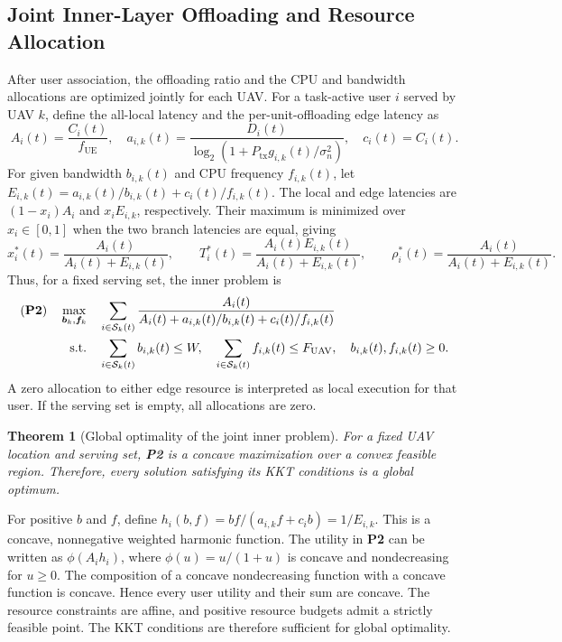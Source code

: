 \documentclass[journal]{IEEEtran}
\newtheorem{theorem}{\bf Theorem}
\begin{document}
\subsection{Joint Inner-Layer Offloading and Resource Allocation}\label{subsec:closed_form}
After user association, the offloading ratio and the CPU and bandwidth
allocations are optimized jointly for each UAV. For a task-active user $i$
served by UAV $k$, define the all-local latency and the per-unit-offloading
edge latency as
\begin{equation}
 A_i(t)=\frac{C_i(t)}{f_{\mathrm{UE}}},\quad
 a_{i,k}(t)=\frac{D_i(t)}
 {\log_2(1+P_{\mathrm{tx}}g_{i,k}(t)/\sigma_n^2)},\quad
 c_i(t)=C_i(t).
\end{equation}
For given bandwidth $b_{i,k}(t)$ and CPU frequency $f_{i,k}(t)$, let
$E_{i,k}(t)=a_{i,k}(t)/b_{i,k}(t)+c_i(t)/f_{i,k}(t)$. The local and edge
latencies are $(1-x_i)A_i$ and $x_iE_{i,k}$, respectively. Their maximum is
minimized over $x_i\in[0,1]$ when the two branch latencies are equal, giving
\begin{equation}\label{eq:optimal_offload_ratio}
 x_i^*(t)=\frac{A_i(t)}{A_i(t)+E_{i,k}(t)},\qquad
 T_i^*(t)=\frac{A_i(t)E_{i,k}(t)}{A_i(t)+E_{i,k}(t)},\qquad
 \rho_i^*(t)=\frac{A_i(t)}{A_i(t)+E_{i,k}(t)}.
\end{equation}
Thus, for a fixed serving set, the inner problem is
\begin{align}
(\textbf{P2})\quad
\max_{\bm{b}_k,\bm{f}_k}\quad&
 \sum_{i\in\mathcal{S}_k(t)}
 \frac{A_i(t)}
 {A_i(t)+a_{i,k}(t)/b_{i,k}(t)+c_i(t)/f_{i,k}(t)}
 \notag\\
\mathrm{s.t.}\quad&
 \sum_{i\in\mathcal{S}_k(t)} b_{i,k}(t)\le W,\quad
 \sum_{i\in\mathcal{S}_k(t)} f_{i,k}(t)\le F_{\mathrm{UAV}},\quad
 b_{i,k}(t),f_{i,k}(t)\ge 0.
\label{eq:joint_inner}
\end{align}
A zero allocation to either edge resource is interpreted as local execution
for that user. If the serving set is empty, all allocations are zero.

\begin{theorem}[Global optimality of the joint inner problem]
For a fixed UAV location and serving set, \textbf{P2} is a concave
maximization over a convex feasible region. Therefore, every solution
satisfying its KKT conditions is a global optimum.
\end{theorem}
\begin{IEEEproof}
For positive $b$ and $f$, define
$h_i(b,f)=bf/(a_{i,k}f+c_i b)=1/E_{i,k}$. This is a concave,
nonnegative weighted harmonic function. The utility in \textbf{P2} can be
written as $\phi(A_i h_i)$, where $\phi(u)=u/(1+u)$ is concave and
nondecreasing for $u\ge0$. The composition of a concave nondecreasing
function with a concave function is concave. Hence every user utility and
their sum are concave. The resource constraints are affine, and positive
resource budgets admit a strictly feasible point. The KKT conditions are
therefore sufficient for global optimality.
\end{IEEEproof}
\end{document}
